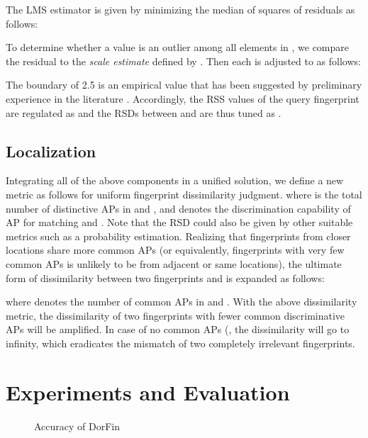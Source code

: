\documentclass[10pt,conference,compsocconf,letterpaper]{./sty/IEEEtran}
\def\3figwidth{0.3\textwidth}
\newcommand{\term}[1]{{\it #1}}
\def\sysname{DorFin}
\newcommand{\rev}[1]{{\color{blue}#1}} \newcommand{\com}[1]{\textbf{\color{red}(COMMENT: #1)}} \else
\newcommand{\rev}[1]{#1}
\newcommand{\com}[1]{}
\begin{document}
The LMS estimator is given by minimizing the median of squares of residuals as follows:




To determine whether a value  is an outlier among all elements in , we compare the residual  to the \term{scale estimate}  defined by \cite{rousseeuw2005robust}. Then each  is adjusted to  as follows:

The boundary of 2.5 is an empirical value that has been \rev{suggested} by preliminary experience in the literature \cite{rousseeuw2005robust}. Accordingly, the RSS values of the query fingerprint  are regulated as 
 and the RSDs  between  and  are thus tuned as 
.


\subsection{Localization}
\label{subsec:localization}

Integrating all of the above components in a unified solution, we define a new metric as follows for uniform fingerprint dissimilarity judgment. 
where  is the total number of distinctive APs in  and , and  denotes the discrimination capability of AP  for matching  and . 
Note that the RSD  could also be given by other suitable metrics such as a probability estimation.
Realizing that fingerprints from closer locations share more common APs (or equivalently, fingerprints with very few common APs is unlikely to be from adjacent or same locations), the ultimate form of dissimilarity between two fingerprints  and  is expanded as follows:

where  denotes the number of common APs in  and . 
With the above dissimilarity metric, the dissimilarity of two fingerprints with fewer common discriminative APs will be amplified. In case of no common APs (, the dissimilarity will go to infinity, which eradicates the mismatch of two completely irrelevant fingerprints. 



\section{Experiments and Evaluation}
\label{sec:evaluation}


\begin{figure*}[t]
	\centering
	\hspace{0.01in}
	\hspace{0.01in}
	\caption{Accuracy of \sysname}
	\label{fig:accuracyDOR}
\end{figure*}
\end{document}
